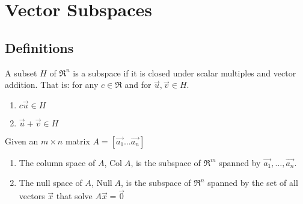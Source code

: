 \section{Vector Subspaces}
\subsection{Definitions}
\begin{definition}
    A subset \(H\) of \(\Re^n\) is a subspace if it is closed under scalar multiples and vector addition. That is: for any \(c \in \Re\) and for \(\Vec{u},\Vec{v}\in H\).
    \begin{enumerate}
        \item \(c\Vec{u} \in H\)
        \item \(\Vec{u} + \Vec{v} \in H\)
    \end{enumerate}
\end{definition}

\begin{definition}
    Given an \(m \times n\) matrix \(A = [\Vec{a_1} \dots \Vec{a_n}]\)
    \begin{enumerate}
        \item The column space of \(A\), \(\text{Col} \; A\), is the subspace of \(\Re^m\) spanned by \(\Vec{a_1}, \dots, \Vec{a_n}\).
        \item The null space of \(A\), \(\text{Null} \; A\), is the subspace of \(\Re^n\) spanned by the set of all vectors \(\Vec{x}\) that solve \(A \Vec{x} = \Vec{0}\)
    \end{enumerate}
\end{definition}